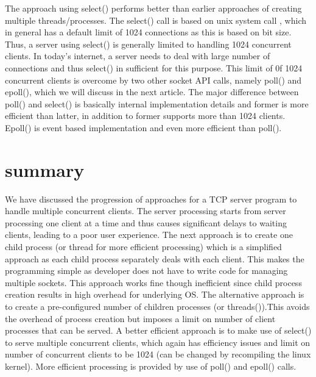 \begin{multicols}{2}
The approach using select() performs better than earlier approaches of creating multiple threads/processes. The select() call is based on unix system call \cite{art1-key14}, which in general has a default limit of 1024 connections as this is based on bit size. Thus, a server using select() is generally limited to handling 1024 concurrent clients. In today’s internet, a server needs to deal with large number of connections and thus select() in sufficient for this purpose. This limit of 0f 1024 concurrent clients is overcome by two other socket API calls, namely poll() and epoll(), which we will discuss in the next article. The major difference between poll() and select() is basically internal implementation details and former is more efficient than latter, in addition to former supports more than 1024 clients. Epoll() is event based implementation and even more efficient than poll().

\section{summary}

We have discussed the progression of approaches for a TCP server program to handle multiple concurrent clients. The server processing starts from server processing one client at a time and thus causes significant delays to waiting clients, leading to a poor user experience. The next approach is to create one child process (or thread for more efficient processing) which is a simplified approach as each child process separately deals with each client. This makes the programming simple as developer does not have to write code for managing multiple sockets. This approach works fine though inefficient since child process creation results in high overhead for underlying OS. The alternative approach is to create a pre-configured number of children processes (or threads()).This avoids the overhead of process creation but imposes a limit on number of client processes that can be served. A better efficient approach is to make use of select() to serve multiple concurrent clients, which again has efficiency issues and limit on number of concurrent clients to be 1024 (can be changed by recompiling the linux kernel). More efficient processing is provided by use of poll() and epoll() calls.


\end{multicols}
